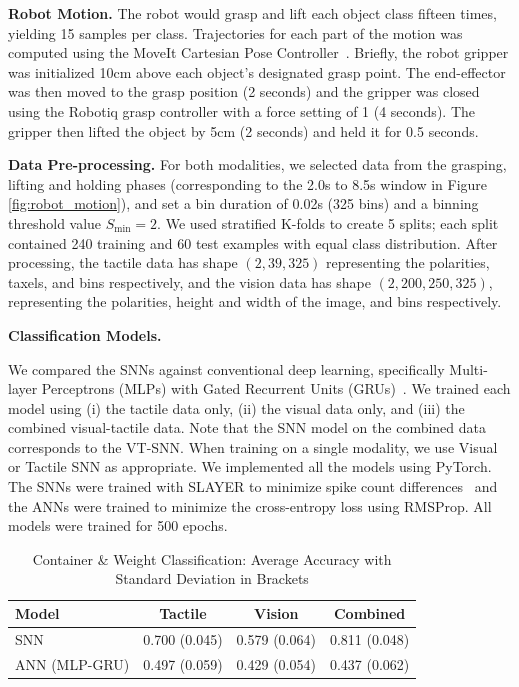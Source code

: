 \documentclass[fyp]{socreport}
\begin{document}
\noindent\textbf{Robot Motion.} The robot would grasp and lift each object class
fifteen times, yielding 15 samples per class. Trajectories for each part of the
motion was computed using the MoveIt Cartesian Pose
Controller~\cite{coleman2014reducing}. Briefly, the robot gripper was
initialized 10cm above each object's designated grasp point. The end-effector
was then moved to the grasp position (2 seconds) and the gripper was closed
using the Robotiq grasp controller with a force setting of 1 (4 seconds). The
gripper then lifted the object by 5cm (2 seconds) and held it for 0.5 seconds.

\noindent\textbf{Data Pre-processing.}
For both modalities, we selected data from the grasping, lifting and holding
phases (corresponding to the 2.0s to 8.5s window in Figure
\ref{fig:robot_motion}), and set a bin duration of 0.02s (325 bins) and a
binning threshold value $S_{\text{min}} = 2$. We used stratified K-folds to
create 5 splits; each split contained 240 training and 60 test examples with
equal class distribution. After processing, the tactile data has shape
$(2, 39, 325)$ representing the polarities, taxels, and bins respectively, and
the vision data has shape $(2, 200, 250, 325)$, representing the polarities,
height and width of the image, and bins respectively.

\noindent\textbf{Classification Models.}

We compared the SNNs against conventional deep learning, specifically
Multi-layer Perceptrons (MLPs) with Gated Recurrent Units
(GRUs)~\cite{cho2014learning}. We trained each model using (i) the tactile data
only, (ii) the visual data only, and (iii) the combined visual-tactile data.
Note that the SNN model on the combined data corresponds to the VT-SNN. When
training on a single modality, we use Visual or Tactile SNN as appropriate. We
implemented all the models using PyTorch. The SNNs were trained with SLAYER to
minimize spike count differences~\cite{NIPS2018_7415} and the ANNs were trained
to minimize the cross-entropy loss using RMSProp. All models were trained for
500 epochs.

\begin{table}
  \centering
  \caption{Container \& Weight Classification: Average Accuracy with Standard Deviation in Brackets}
  \label{tbl:classacc325}
  \begin{tabular}{l|ccc}
    \hline
    \hline
    \textbf{Model} & \textbf{Tactile} & \textbf{Vision} & \textbf{Combined} \\
    \hline
    SNN  & {0.700} (0.045) & 0.579 (0.064)  & 0.811 (0.048)\\
    \hline
    ANN (MLP-GRU) & 0.497 (0.059) & 0.429 (0.054) & 0.437 (0.062)\\
    \hline
    \hline
  \end{tabular}
\end{table}
\end{document}

